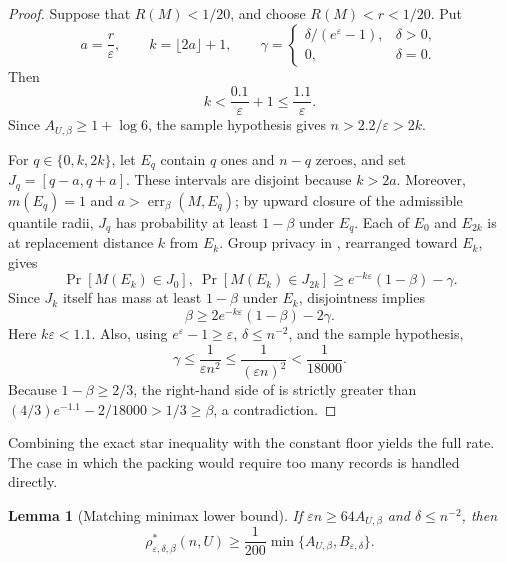 \documentclass[11pt]{article}
\newtheorem{lemma}{Lemma}[section]
\begin{document}
\begin{proof}
Suppose that $R(M)<1/20$, and choose $R(M)<r<1/20$.  Put
\[
 a=\frac r\varepsilon,
 \qquad
 k=\lfloor2a\rfloor+1,
 \qquad
 \gamma=
 \begin{cases}
  \delta/(e^\varepsilon-1),&\delta>0,\\
  0,&\delta=0.
 \end{cases}
\]
Then
\[
 k<\frac{0.1}{\varepsilon}+1\le\frac{1.1}{\varepsilon}.
\]
Since $A_{U,\beta}\ge1+\log6$, the sample hypothesis gives
$n>2.2/\varepsilon>2k$.

For $q\in\{0,k,2k\}$, let $E_q$ contain $q$ ones and $n-q$ zeroes, and set
$J_q=[q-a,q+a]$.  These intervals are disjoint because $k>2a$.  Moreover,
$m(E_q)=1$ and $a>\operatorname{err}_{\beta}(M,E_q)$; by upward closure of
the admissible quantile radii, $J_q$ has probability at least $1-\beta$
under $E_q$.  Each of $E_0$ and $E_{2k}$ is at replacement distance $k$ from
$E_k$.  Group privacy in , rearranged toward $E_k$,
gives
\[
 \Pr[M(E_k)\in J_0],\ \Pr[M(E_k)\in J_{2k}]
 \ge e^{-k\varepsilon}(1-\beta)-\gamma.
\]
Since $J_k$ itself has mass at least $1-\beta$ under $E_k$, disjointness
implies
\begin{equation}
 \beta\ge2e^{-k\varepsilon}(1-\beta)-2\gamma.
 \label{eq:floor-contradiction}
\end{equation}
Here $k\varepsilon<1.1$.  Also, using
$e^\varepsilon-1\ge\varepsilon$, $\delta\le n^{-2}$, and the sample
hypothesis,
\[
 \gamma\le\frac1{\varepsilon n^2}
 \le\frac1{(\varepsilon n)^2}<\frac1{18000}.
\]
Because $1-\beta\ge2/3$, the right-hand side of
 is strictly greater than
$(4/3)e^{-1.1}-2/18000>1/3\ge\beta$, a contradiction.
\end{proof}

Combining the exact star inequality with the constant floor yields the full
rate.  The case in which the packing would require too many records is
handled directly.

\begin{lemma}[Matching minimax lower bound]
\label{lem:full-lower}
If $\varepsilon n\ge64A_{U,\beta}$ and $\delta\le n^{-2}$, then
\[
 \rho^*_{\varepsilon,\delta,\beta}(n,U)
 \ge\frac1{200}\min\{A_{U,\beta},B_{\varepsilon,\delta}\}.
\]
\end{lemma}
\end{document}
